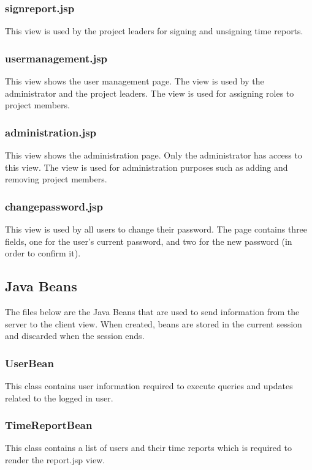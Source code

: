 \documentclass{article}
\begin{document}
\subsubsection{signreport.jsp}
This view is used by the project leaders for signing and unsigning time reports.

\subsubsection{usermanagement.jsp}
This view shows the user management page. The view is used by the administrator and the project leaders. The view is used for assigning roles to project members.

\subsubsection{administration.jsp}
This view shows the administration page. Only the administrator has access to this view. The view is used for administration purposes such as adding and removing project members. 

\subsubsection{changepassword.jsp}
This view is used by all users to change their password. The page contains three fields, one for the user's current password, and two for the new password (in order to confirm it).

\subsection{Java Beans}
The files below are the Java Beans that are used to send information from the server to the client view. When created, beans are stored in the current session and discarded when the session ends.

\subsubsection{UserBean}
This class contains user information required to execute queries and updates related to the logged in user.

\subsubsection{TimeReportBean}
This class contains a list of users and their time reports which is required to render the report.jsp view.
\end{document}
